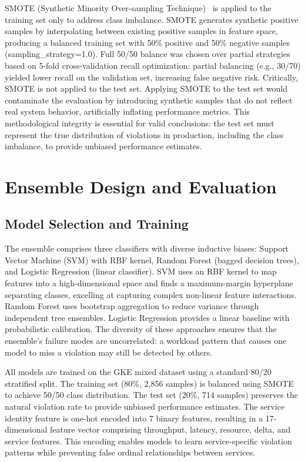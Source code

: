\documentclass[conference]{IEEEtran}
\begin{document}
SMOTE (Synthetic Minority Over-sampling Technique)~\cite{smote} is applied to the training set only to address class imbalance. SMOTE generates synthetic positive samples by interpolating between existing positive samples in feature space, producing a balanced training set with 50\% positive and 50\% negative samples (sampling\_strategy=1.0). Full 50/50 balance was chosen over partial strategies based on 5-fold cross-validation recall optimization: partial balancing (e.g., 30/70) yielded lower recall on the validation set, increasing false negative risk. Critically, SMOTE is not applied to the test set. Applying SMOTE to the test set would contaminate the evaluation by introducing synthetic samples that do not reflect real system behavior, artificially inflating performance metrics. This methodological integrity is essential for valid conclusions: the test set must represent the true distribution of violations in production, including the class imbalance, to provide unbiased performance estimates.


\section{Ensemble Design and Evaluation}

\subsection{Model Selection and Training}

The ensemble comprises three classifiers with diverse inductive biases: Support Vector Machine (SVM) with RBF kernel, Random Forest (bagged decision trees), and Logistic Regression (linear classifier). SVM uses an RBF kernel to map features into a high-dimensional space and finds a maximum-margin hyperplane separating classes, excelling at capturing complex non-linear feature interactions. Random Forest uses bootstrap aggregation to reduce variance through independent tree ensembles. Logistic Regression provides a linear baseline with probabilistic calibration. The diversity of these approaches ensures that the ensemble's failure modes are uncorrelated: a workload pattern that causes one model to miss a violation may still be detected by others.

All models are trained on the GKE mixed dataset using a standard 80/20 stratified split. The training set (80\%, 2,856 samples) is balanced using SMOTE to achieve 50/50 class distribution. The test set (20\%, 714 samples) preserves the natural violation rate to provide unbiased performance estimates. The service identity feature is one-hot encoded into 7 binary features, resulting in a 17-dimensional feature vector comprising throughput, latency, resource, delta, and service features. This encoding enables models to learn service-specific violation patterns while preventing false ordinal relationships between services.
\end{document}
